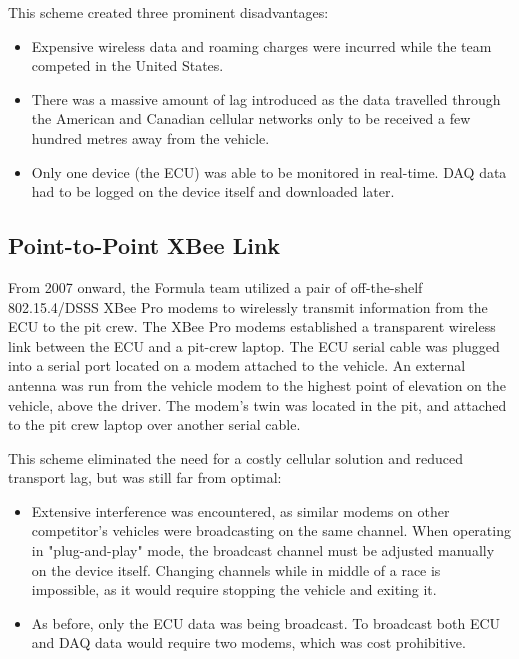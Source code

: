 This scheme created three prominent disadvantages:

\begin{itemize}

\item Expensive wireless data and roaming charges were incurred while the team competed in the United States. 

\item There was a massive amount of lag introduced as the data travelled through the American and Canadian cellular networks only to be received a few hundred metres away from the vehicle.

\item Only one device (the ECU) was able to be monitored in real-time. DAQ data had to be logged on the device itself and downloaded later.

\end{itemize}

\subsection{Point-to-Point XBee Link}

From 2007 onward, the Formula team utilized a pair of off-the-shelf 802.15.4/DSSS XBee Pro modems to wirelessly transmit information from the ECU to the pit crew. The XBee Pro modems established a transparent wireless link between the ECU and a pit-crew laptop. The ECU serial cable was plugged into a serial port located on a modem attached to the vehicle. An external antenna was run from the vehicle modem to the highest point of elevation on the vehicle, above the driver. The modem's twin was located in the pit, and attached to the pit crew laptop over another serial cable.

This scheme eliminated the need for a costly cellular solution and reduced transport lag, but was still far from optimal:

\begin{itemize}

\item Extensive interference was encountered, as similar modems on other competitor's vehicles were broadcasting on the same channel. When operating in "plug-and-play" mode, the broadcast channel must be adjusted manually on the device itself. Changing channels while in middle of a race is impossible, as it would require stopping the vehicle and exiting it.

\item As before, only the ECU data was being broadcast. To broadcast both ECU and DAQ data would require two modems, which was cost prohibitive.

\end{itemize}
